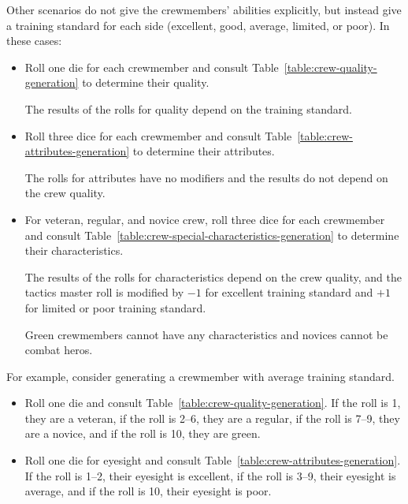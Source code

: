 \begin{advancedrules}
{Other scenarios do not give the crewmembers’ abilities explicitly, but instead give a training standard for each side (excellent, good, average, limited, or poor). In these cases:

\begin{itemize}
    
    \item Roll one die for each crewmember and consult Table~\ref{table:crew-quality-generation} to determine their quality. 

    The results of the rolls for quality depend on the training standard.

    \item Roll three dice for each crewmember and consult Table~\ref{table:crew-attributes-generation} to determine their attributes. 
    
    The rolls for attributes have no modifiers and the results do not depend on the crew quality.
    
    \item For veteran, regular, and novice crew, roll three dice for each crewmember and consult Table~\ref{table:crew-special-characteristics-generation} to determine their characteristics. 
    
    The results of the rolls for characteristics depend on the crew quality, and the tactics master roll is modified by $-1$ for excellent training standard and $+1$ for limited or poor training standard. 
    
    Green crewmembers cannot have any characteristics and novices cannot be combat heros.
\end{itemize}


For example, consider generating a crewmember with average training standard.

\begin{itemize}
\item Roll one die and consult Table~\ref{table:crew-quality-generation}. If the roll is 1, they are a veteran, if the roll is 2--6, they are a regular, if the roll is 7--9, they are a novice, and if the roll is 10, they are green.

\item Roll one die for eyesight and consult Table~\ref{table:crew-attributes-generation}. If the roll is 1--2, their eyesight is excellent, if the roll is 3--9, their eyesight is average, and if the roll is 10, their eyesight is poor. 


\end{itemize}}
\end{advancedrules}
